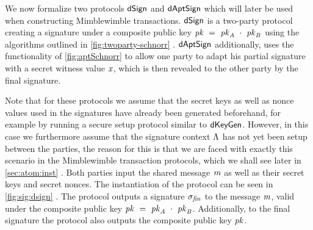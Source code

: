We now formalize two protocols $\mathsf{dSign}$ and $\mathsf{dAptSign}$ which will later be used when constructing Mimblewimble transactions.
$\mathsf{dSign}$ is a two-party protocol creating a signature under a composite public key $\mathit{pk} ~=~ \mathit{pk}_{\mathit{A}} ~\cdot~ \mathit{pk}_{\mathit{B}}$ using the algorithms outlined in \cref{fig:twoparty-schnorr} .
$\mathsf{dAptSign}$ additionally, uses the functionality of \cref{fig:aptSchnorr} to allow one party to adapt his partial signature with a secret witness value $\mathit{x}$, which is then revealed to the other party by the final signature.

Note that for these protocols we assume that the secret keys as well as nonce values used in the signatures have already been generated beforehand, for example by running a secure setup protocol similar to $\mathsf{dKeyGen}$.
However, in this case we furthermore assume that the signature context $\Lambda$ has not yet been setup between the parties, the reason for this is that we are faced with exactly this scenario in the Mimblewimble transaction protocols, which we shall see later in \cref{sec:atom:inst} .
Both parties input the shared message $\mathit{m}$ as well as their secret keys and secret nonces.
The instantiation of the protocol can be seen in \cref{fig:sig:dsign} .
The protocol outputs a signature $\sigma_{\mathit{fin}}$ to the message $\mathit{m}$, valid under the composite public key $\mathit{pk} ~=~ \mathit{pk}_{\mathit{A}} ~\cdot~ \mathit{pk}_{\mathit{B}}$.
Additionally, to the final signature the protocol also outputs the composite public key $\mathit{pk}$.

